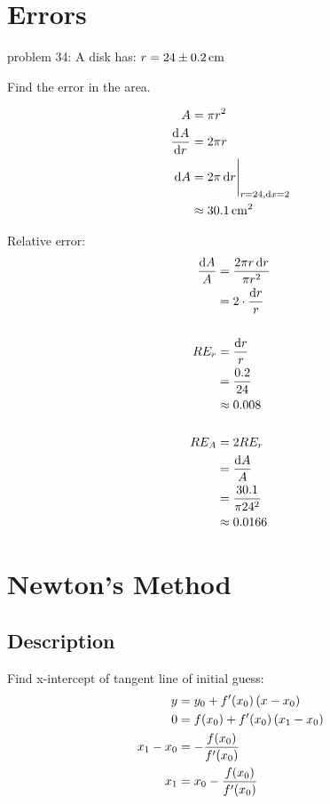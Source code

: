 \documentclass[letterpaper, landscape]{exam}
\begin{document}
  \section{Errors} %
  
  problem 34: A disk has: $r = \unit[24 \pm 0.2]{cm}$

  Find the error in the area.

  \begin{solution}
    \begin{align*}
      A          & = \pi r^2 \\
      \dod{A}{r} & = 2 \pi r \\
      \dif A     & = \eval{ 2 \pi \dif r }_{r = 24, \dif x = 2} \\
                 & \approx \unit[30.1]{cm^2} \\
    \end{align*}

    Relative error:
    \begin{align*}
      \frac{\dif A}{A} & = \frac{2 \pi r \dif r}{\pi r^2} \\
                       & = 2 \cdot \frac{\dif r}{r} \\
      \\
      RE_r             & = \frac{\dif r}{r} \\
                       & = \frac{0.2}{24} \\
                       & \approx 0.008 \\
      \\
      RE_A             & = 2 RE_r \\
                       & = \frac{\dif A}{A} \\
                       & = \frac{30.1}{\pi 24^2} \\
                       & \approx 0.0166 \\
    \end{align*}
  \end{solution}

  \section{Newton's Method} %

  \subsection{Description} %
  
  Find x-intercept of tangent line of initial guess:
  \begin{align*}
    y         & = y_0 + f'(x_0) \del{x - x_0} \\
    0         & = f(x_0) + f'(x_0) \del{x_1 - x_0} \\
    x_1 - x_0 & = - \frac{f(x_0)}{f'(x_0)} \\
    x_1       & = x_0 - \frac{f(x_0)}{f'(x_0)} \\
  \end{align*}
\end{document}
